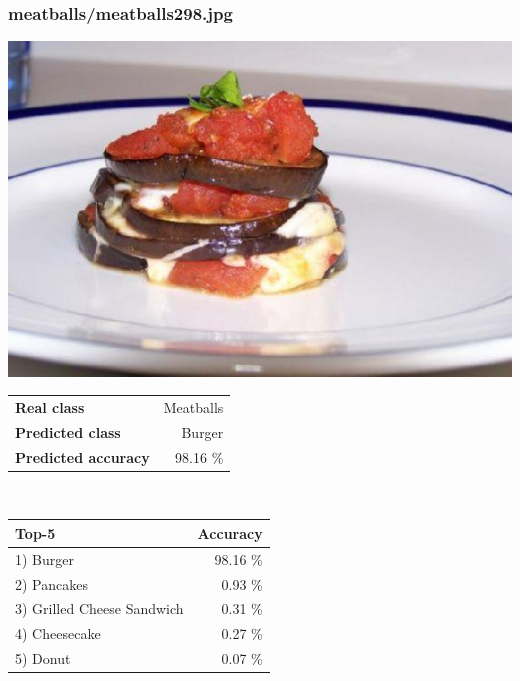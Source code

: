 \subsubsection{meatballs/meatballs298.jpg}

\begin{minipage}[t]{0.4\textwidth}
	\vspace{0pt}
	\includegraphics[width=\linewidth]{images/evaluation-images/meatballs/meatballs298.jpg}
\end{minipage}
\hfill
\begin{minipage}[t]{0.5\textwidth}
	\vspace{0pt}\raggedright
	\begin{tabularx}{\textwidth}{X r}
		\small \textbf{Real class} & \small Meatballs\\
		\small \textbf{Predicted class} & \small Burger\\
		\small \textbf{Predicted accuracy} & \small 98.16 \%
    \end{tabularx}\\
    
    \vspace{6pt}
	\begin{tabularx}{\textwidth}{X r}
        \small \textbf{Top-5} & \small \textbf{Accuracy} \\
        \hline
		\small 1) Burger & \small 98.16 \%\\\small 2) Pancakes & \small 0.93 \%\\\small 3) Grilled Cheese Sandwich & \small 0.31 \%\\\small 4) Cheesecake & \small 0.27 \%\\\small 5) Donut & \small 0.07 \%
    \end{tabularx}
\end{minipage}
    
